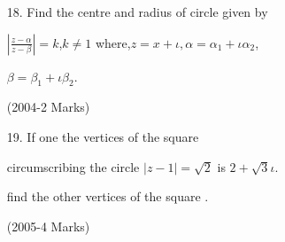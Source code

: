 \documentclass[journal,12pt,twocolumn]{IEEEtran}
\theoremstyle{remark}
\begin{document}
\begin{enumerate}
      
\item[18.] Find the centre and radius  of circle given by

    $|\frac{z-\alpha}
    {z-\beta}|=k$,$k\not=1$ 
    where,$z=x+\iota,\alpha=\alpha_1+\iota \alpha_2  $, 
    
    $\beta=\beta_1+\iota \beta_2$. 
    
    \hfill(2004-2 Marks) \\
      
\item[19.] If one the vertices of the square 

circumscribing the circle $|z-1|= \sqrt{2}$ is $2+\sqrt{3} \iota$.

find the other vertices of the square .

\hfill (2005-4 Marks) \\

\end{enumerate}
\end{document}

